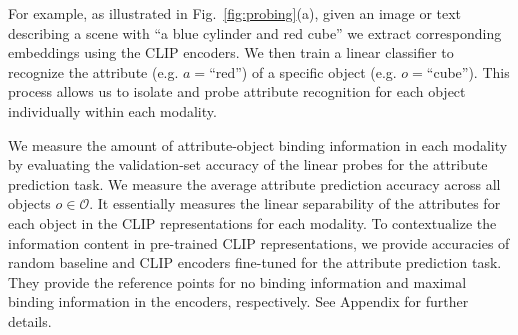 For example, as illustrated in Fig.~\ref{fig:probing}(a), given an image or text describing a scene with ``a blue cylinder and red cube'' we extract corresponding embeddings using the CLIP encoders. We then train a linear classifier to recognize the attribute (e.g. $a=$``red'') of a specific object (e.g. $o=$``cube''). This process allows us to isolate and probe attribute recognition for each object individually within each modality.

We measure the amount of attribute-object binding information in each modality by evaluating the validation-set accuracy of the linear probes for the attribute prediction task. We measure the average attribute prediction accuracy across all objects $o\in \mathcal{O}$. It essentially measures the linear separability of the attributes for each object in the CLIP representations for each modality.
To contextualize the information content in pre-trained CLIP representations, we provide accuracies of random baseline and CLIP encoders fine-tuned for the attribute prediction task. They provide the reference points for no binding information and maximal binding information in the encoders, respectively.
See Appendix for further details.





